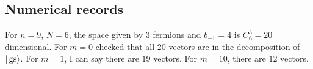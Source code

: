 %

\subsection{Numerical records}
For $n = 9$, $N = 6$, the space given by $3$ fermions and $b_{-1} = 4$ is $C_6^3 = 20$ dimensional. For $m = 0$ checked that all $20$ vectors are in the decomposition of $|\operatorname{gs}\rangle$. For $m=1$, I can say there are $19$ vectors. For $m = 10$, there are $12$ vectors.